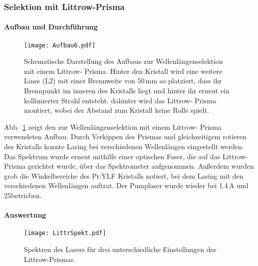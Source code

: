 \subsubsection{Selektion mit Littrow-Prisma}

\paragraph{Aufbau und Durchführung}

\begin{figure}[H]
\begin{center}
  \texttt{[image: Aufbau6.pdf]}
  \caption{Schematische Darstellung des Aufbaus zur Wellenlängenselektion mit einem Littrow-
  Prisma. Hinter den Kristall wird eine weitere Linse (L2) mit einer Brennweite von 50\,mm so
  platziert, dass ihr Brennpunkt im inneren des Kristalls liegt und hinter ihr erneut ein
  kollimierter Strahl entsteht. dahinter wird das Littrow- Prisma montiert, wobei der Abstand zum
  Kristall keine Rolle spielt.}
  \label{img:aufbau6}
\end{center}
\end{figure}

Abb.~\ref{img:aufbau6} zeigt den zur Wellenlängenselektion mit einem Littrow- Prisma verwendeten
Aufbau. Durch Verkippen des Prismas und gleichzeitigem rotieren des Kristalls konnte Lasing bei
verschiedenen Wellenlängen eingestellt werden. Das Spektrum wurde erneut mithilfe einer optischen
Faser, die auf das Littrow- Prisma gerichtet wurde, über das Spektrometer aufgenommen.
Außerdem wurden grob die Winkelbereiche des Pr:YLF Kristalls notiert, bei dem Lasing
mit den verschiedenen Wellenlängen auftrat.
Der Pumplaser wurde wieder bei 1.4\,A und 25\grad betrieben.



\paragraph{Auswertung}



\begin{figure}[H]
\begin{center}
  \texttt{[image: LittrSpekt.pdf]}
  \caption{Spektren des Lasers für drei unterschiedliche Einstellungen des Littrow-Prismas.}
  \label{img:LittrSpekt}
\end{center}
\end{figure}
